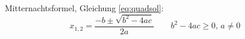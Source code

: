 Mitternachtsformel, Gleichung \ref{eq:quadsol}:
\begin{equation}\label{eq:quadsol}
	x_{1,2} = \frac{-b \pm \sqrt{b^2-4ac}}{2a}
	\qquad b^2-4ac \geq 0,\, a \neq 0
\end{equation}
